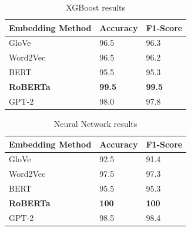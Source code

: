 \begin{table}[hbt!]
\begin{threeparttable}
\caption{XGBoost results}
\label{xgb_results}
\begin{tabular}{lll}
\toprule
\headrow Embedding Method & Accuracy & F1-Score\\
\midrule
 GloVe    &       96.5 &       96.3 \\
 Word2Vec &       96.5 &       96.2 \\
 BERT     &       95.5 &       95.3 \\
 \textbf{RoBERTa}  &       \textbf{99.5} &       \textbf{99.5} \\
 GPT-2    &       98.0 &       97.8 \\
\bottomrule
\end{tabular}
\end{threeparttable}
\end{table}

\begin{table}[hbt!]
\begin{threeparttable}
\caption{Neural Network results}
\label{nn_results}
\begin{tabular}{lll}
\toprule
\headrow Embedding Method & Accuracy & F1-Score\\
\midrule
 GloVe    &       92.5 &       91.4 \\
 Word2Vec &       97.5 &       97.3 \\
 BERT     &       95.5 &       95.3 \\
 \textbf{RoBERTa}  &        \textbf{100} &        \textbf{100} \\
 GPT-2    &       98.5 &       98.4 \\
\bottomrule
\end{tabular}
\end{threeparttable}
\end{table}




